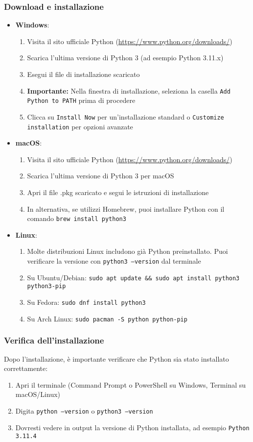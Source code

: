 \subsubsection{Download e installazione}
\begin{itemize}
\item \textbf{Windows}:
\begin{enumerate}
\item Visita il sito ufficiale Python (\url{https://www.python.org/downloads/})
\item Scarica l'ultima versione di Python 3 (ad esempio Python 3.11.x)
\item Esegui il file di installazione scaricato
\item \textbf{Importante:} Nella finestra di installazione, seleziona la casella \texttt{Add Python to PATH} prima di procedere
\item Clicca su \texttt{Install Now} per un'installazione standard o \texttt{Customize installation} per opzioni avanzate
\end{enumerate}
\item \textbf{macOS}:
\begin{enumerate}
    \item Visita il sito ufficiale Python (\url{https://www.python.org/downloads/})
    \item Scarica l'ultima versione di Python 3 per macOS
    \item Apri il file .pkg scaricato e segui le istruzioni di installazione
    \item In alternativa, se utilizzi Homebrew, puoi installare Python con il comando \texttt{brew install python3}
\end{enumerate}

\item \textbf{Linux}:
\begin{enumerate}
    \item Molte distribuzioni Linux includono già Python preinstallato. Puoi verificare la versione con \texttt{python3 --version} dal terminale
    \item Su Ubuntu/Debian: \texttt{sudo apt update \&\& sudo apt install python3 python3-pip}
    \item Su Fedora: \texttt{sudo dnf install python3}
    \item Su Arch Linux: \texttt{sudo pacman -S python python-pip}
\end{enumerate}
\end{itemize}
\subsubsection{Verifica dell'installazione}
Dopo l'installazione, è importante verificare che Python sia stato installato correttamente:
\begin{enumerate}
\item Apri il terminale (Command Prompt o PowerShell su Windows, Terminal su macOS/Linux)
\item Digita \texttt{python --version} o \texttt{python3 --version}
\item Dovresti vedere in output la versione di Python installata, ad esempio \texttt{Python 3.11.4}
\end{enumerate}
